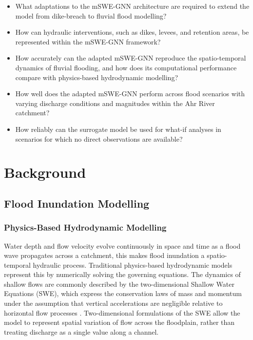 \documentclass[12pt,a4paper]{report}
\begin{document}
\begin{itemize}
    \item[\textbf{SQ1}] What adaptations to the mSWE-GNN architecture are required to extend the model from dike-breach to fluvial flood modelling?

    \item[\textbf{SQ2}] How can hydraulic interventions, such as dikes, levees, and retention areas, be represented within the mSWE-GNN framework?

    \item[\textbf{SQ3}] How accurately can the adapted mSWE-GNN reproduce the spatio-temporal dynamics of fluvial flooding, and how does its computational performance compare with physics-based hydrodynamic modelling?

    \item[\textbf{SQ4}] How well does the adapted mSWE-GNN perform across flood scenarios with varying discharge conditions and magnitudes within the Ahr River catchment?

    \item[\textbf{SQ5}] How reliably can the surrogate model be used for what-if analyses in scenarios for which no direct observations are available?
\end{itemize}




 
\chapter{Background}
\label{ch:background}
 
\section{Flood Inundation Modelling}
\label{sec:flood_modelling}
 
\subsection{Physics-Based Hydrodynamic Modelling}
\label{subsec:physics_based}

Water depth and flow velocity
evolve continuously in space and time as a flood wave propagates across a catchment, this makes flood inundation a spatio-temporal hydraulic process.
Traditional physics-based hydrodynamic models represent this by numerically solving the governing equations.
The dynamics
of shallow flows are commonly described by the two-dimensional
Shallow Water Equations (SWE), which express the conservation laws of mass and momentum under the
assumption that vertical accelerations are negligible relative to horizontal flow
processes \citep{vreugdenhil1994numerical}.
Two-dimensional formulations of the SWE allow the model to represent spatial
variation of flow across the floodplain, rather than treating discharge as a single
value along a channel.
\end{document}

